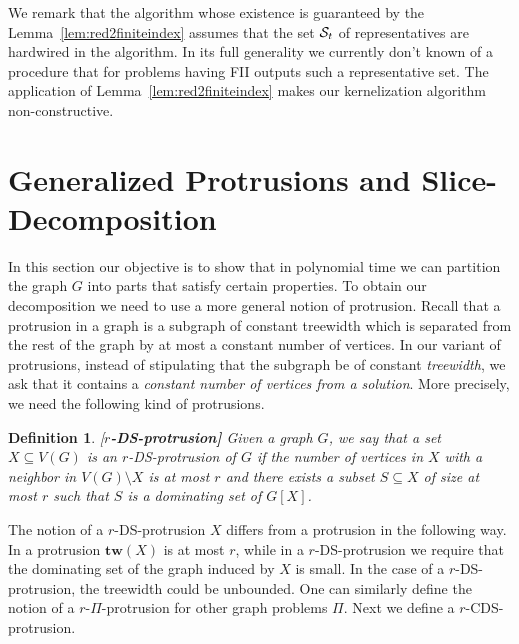 \documentclass[11pt]{article}
\newtheorem{definition}{Definition}
\newcommand{\tw}{{\mathbf{tw}}}
\begin{document}
 We remark that the algorithm whose existence is guaranteed by the Lemma~\ref{lem:red2finiteindex} assumes that the set  ${\cal S}_{t}$ of representatives  are hardwired in the algorithm.  In its full generality we currently don't known of a procedure that for problems having FII outputs such a representative set. The application of Lemma~\ref{lem:red2finiteindex}  makes our kernelization algorithm non-constructive.  












\section{Generalized  Protrusions and Slice-Decomposition}\label{sec:slicedecs}


In this section our objective is to show that in polynomial time we can  
partition the graph $G$  into parts that satisfy certain properties.  
To obtain  our decomposition we need to use a more general  notion of 
protrusion. Recall that a protrusion in a graph  is a subgraph of constant treewidth which is separated from the rest of the graph by at most a constant number of vertices. In our variant of protrusions, instead of stipulating that the subgraph be of constant {\em treewidth}, we ask that it contains a {\em constant number of vertices from a solution}. More precisely, we need the following kind of protrusions. 
\begin{definition}{\rm [\bf $r$-{\sc DS}-protrusion]} 
 Given a graph $G$, we say that a set $X\subseteq V(G)$ is an {\em $r$-{\sc DS}-protrusion} of $G$ if 
   the number of vertices in $X$ with a neighbor in $V(G)\setminus X$ is at most $r$ and there exists a 
   subset $S\subseteq X$ of size at most $r$ such that  $S$ is a dominating set of $G[X]$. 
\end{definition}





The notion of a $r$-{\sc DS}-protrusion $X$ differs from a protrusion in the following way. In a 
protrusion  $\tw(X)$ is at most $r$, while in a $r$-{\sc DS}-protrusion we require that the dominating set of the graph induced by  $X$ is small. In the case of a $r$-{\sc DS}-protrusion, the treewidth could be unbounded. One can similarly define the notion of a $r$-$\Pi$-protrusion for other graph problems $\Pi$. Next we define a 
$r$-{\sc CDS}-protrusion. 
\end{document}
